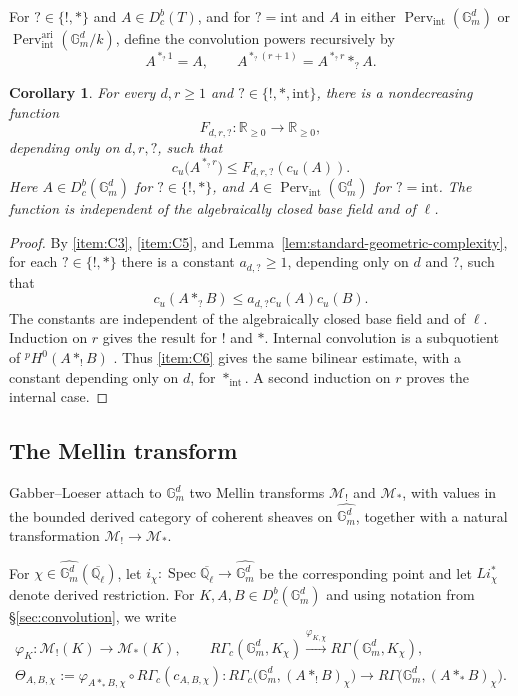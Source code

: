 \documentclass[12pt,reqno]{amsart}
\theoremstyle{definition}
\theoremstyle{plain}
\newtheorem{cor}[para]{Corollary}
\theoremstyle{definition}
\theoremstyle{remark}
\newcommand{\bbG}{\mathbb{G}}  \newcommand{\bbH}{\mathbb{H}}
\newcommand{\bbQ}{\mathbb{Q}}  \newcommand{\bbR}{\mathbb{R}}
\newcommand{\ol}[1]{\overline{#1}}
\newcommand{\Ql}{\bbQ_{\ell}}
\newcommand{\Db}{D^b_c}
\newcommand{\Gm}{\bbG_m}
\newcommand{\Perv}{\operatorname{Perv}}
\newcommand{\cu}{c_u}
\begin{document}
For \(?\in\{!,*\}\) and \(A\in\Db(T)\), and for \(?=\mathrm{int}\) and \(A\) in either
\(\Perv_{\mathrm{int}}(\Gm^d)\) or \(\Perv_{\mathrm{int}}^{\mathrm{ari}}(\Gm^d/k)\), define the convolution
powers recursively by
\[
        A^{\ast_?1}=A,
        \qquad
        A^{\ast_?(r+1)}=A^{\ast_?r}\ast_?A.
\]

\begin{cor}
\label{cor:convolution-complexity}
For every \(d,r\ge1\) and \(?\in\{!,*,\mathrm{int}\}\), there is a nondecreasing function
\[
        F_{d,r,?}:\mathbb R_{\ge0}\longrightarrow\mathbb R_{\ge0},
\]
depending only on \(d,r,?\), such that
\[
        \cu\bigl(A^{\ast_?r}\bigr)\le F_{d,r,?}(\cu(A)).
\]
Here \(A\in\Db(\Gm^d)\) for \(?\in\{!,*\}\), and \(A\in\Perv_{\mathrm{int}}(\Gm^d)\) for
\(?=\mathrm{int}\).  The function is independent of the algebraically closed base field and of \(\ell\).
\end{cor}

\begin{proof}
By \ref{item:C3}, \ref{item:C5}, and Lemma~\ref{lem:standard-geometric-complexity}, for each
\(?\in\{!,*\}\) there is a constant \(a_{d,?}\ge1\), depending only on \(d\) and \(?\), such that
\[
        \cu(A\ast_?B)\le a_{d,?}\cu(A)\cu(B).
\]
The constants are independent of the algebraically closed base field and of \(\ell\).  Induction on \(r\)
gives the result for \(!\) and \(*\).  Internal convolution is a subquotient of
\({}^pH^0(A\ast_!B)\)
\cite[Def.~3.7.1, Def.-Prop.~3.7.2]{GabberLoeser1996}.  Thus \ref{item:C6} gives the same bilinear
estimate, with a constant depending only on \(d\), for \(\ast_{\mathrm{int}}\).  A second induction on
\(r\) proves the internal case.
\end{proof}

\subsection{The Mellin transform}
\label{sec:mellin}

Gabber--Loeser \cite[\S3.3]{GabberLoeser1996} attach to \(\Gm^d\) two Mellin transforms
\(\mathscr M_!\) and \(\mathscr M_*\), with values in the bounded derived category of coherent sheaves on
\(\widehat{\Gm^d}\), together with a natural transformation \(\mathscr M_!\to\mathscr M_*\).

For \(\chi\in\widehat{\Gm^d}(\ol\Ql)\), let \(i_\chi:\operatorname{Spec}\ol\Ql\to\widehat{\Gm^d}\) be the
corresponding point and let \(Li_\chi^*\) denote derived restriction.  For
\(K,A,B\in\Db(\Gm^d)\) and using notation from \S\ref{sec:convolution}, we write
\begin{equation}
\label{eq:comparison-notation}
\begin{gathered}
        \varphi_K\colon \mathscr M_!(K)\longrightarrow\mathscr M_*(K),
        \qquad
        R\Gamma_c(\Gm^d,K_\chi)
        \xrightarrow{\varphi_{K,\chi}}
        R\Gamma(\Gm^d,K_\chi),\\
        \Theta_{A,B,\chi}
        :=\varphi_{A\ast_*B,\chi}\circ R\Gamma_c(c_{A,B,\chi})\colon
        R\Gamma_c\bigl(\Gm^d,(A\ast_!B)_\chi\bigr)
        \longrightarrow R\Gamma\bigl(\Gm^d,(A\ast_*B)_\chi\bigr).
\end{gathered}
\end{equation}
\end{document}
